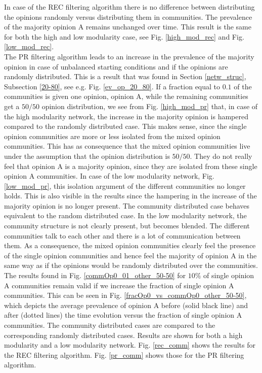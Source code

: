 \documentclass[11 pt , letterpaper , twoside , openright]{book}
\begin{document}
\newpage
\noindent
In case of the REC filtering algorithm there is no difference between distributing the opinions randomly versus distributing them in communities. The prevalence of the majority opinion A remains unchanged over time. This result is the same for both the high and low modularity case, see Fig. \ref{high_mod_rec} and Fig. \ref{low_mod_rec}.\\
\newline
The PR filtering algorithm leads to an increase in the prevalence of the majority opinion in case of unbalanced starting conditions and if the opinions are randomly distributed. This is a result that was found in Section \ref{netw_struc}, Subsection \ref{20-80}, see e.g. Fig. \ref{ev_op_20_80}. If a fraction equal to $0.1$ of the communities is given one opinion, opinion A, while the remaining communities get a $50/50$ opinion distribution, we see from Fig. \ref{high_mod_pr} that, in case of the high modularity network, the increase in the majority opinion is hampered compared to the randomly distributed case. This makes sense, since the single opinion communities are more or less isolated from the mixed opinion communities. This has as consequence that the mixed opinion communities live under the assumption that the opinion distribution is $50/50$. They do not really feel that opinion A is a majority opinion, since they are isolated from these single opinion A communities. In case of the low modularity network, Fig. \ref{low_mod_pr}, this isolation argument of the different communities no longer holds. This is also visible in the results since the hampering in the increase of the majority opinion is no longer present. The community distributed case behaves equivalent to the random distributed case. In the low modularity network, the community structure is not clearly present, but becomes blended. The different communities talk to each other and there is a lot of communication between them. As a consequence, the mixed opinion communities clearly feel the presence of the single opinion communities and hence feel the majority of opinion A in the same way as if the opinions would be randomly distributed over the communities. \\
\newline
The results found in Fig. \ref{commOp0_01_other_50-50} for $10 \%$ of single opinion A communities remain valid if we increase the fraction of single opinion A communities. This can be seen in Fig. \ref{fracOp0_vs_commOp0_other_50-50}, which depicts the average prevalence of opinion A before (solid black line) and after (dotted lines) the time evolution versus the fraction of single opinion A communities. The community distributed cases are compared to the corresponding randomly distributed cases. Results are shown for both a high modularity and a low modularity network. Fig. \ref{rec_comm} shows the results for the REC filtering algorithm. Fig. \ref{pr_comm} shows those for the PR filtering algorithm.\\
\end{document}
